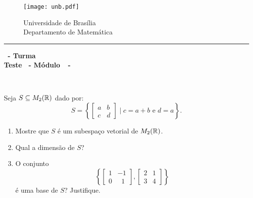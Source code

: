 \documentclass[12pt]{exam}
\begin{document}
    \begin{figure}[h]
        \begin{minipage}[c]{1.7cm}
            \texttt{[image: unb.pdf]}
        \end{minipage}
        \hspace{0pt}
        \begin{minipage}[c]{4in}
            {Universidade de Brasília} \\
            {Departamento de Matemática}
        \end{minipage}
    \end{figure}
    \hrule
    \begin{center}
        {\Large\bf \disciplina\ - Turma \turma}  \\
         {\large\bf Teste \numeroteste\ - Módulo\ \modulo\ -\ \dataavaliacao}
    \end{center}

    \\
    \vspace*{.01cm}

    \vspace{.4cm}

    \questao{} Seja $S \subseteq M_2(\mathbb{R})$ dado por:
    \[
    S = \left\{
    \begin{bmatrix}
        a & b\\
        c & d
    \end{bmatrix}
    \mid c = a+b \mbox{ e } d = a
    \right\}.
    \]

    \begin{enumerate}[label={\alph*})]
        \item Mostre que $S$ é um subespaço vetorial de $M_2(\mathbb{R})$.

        \item Qual a dimensão de $S$?

        \item O conjunto
        \[
        \left\{
        \begin{bmatrix}
            1 & -1\\
            0 & \phantom{x} 1
        \end{bmatrix},
        \begin{bmatrix}
            2 & 1\\
            3 & 4
        \end{bmatrix}
        \right\}
        \]
        é uma base de $S$? Justifique.
    \end{enumerate}
\end{document}
